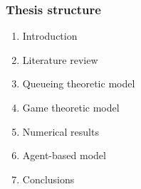 \begin{frame}
    \frametitle{Thesis structure}
    
    \begin{enumerate}
        \item Introduction
        \item Literature review
        \item Queueing theoretic model
        \item Game theoretic model
        \item Numerical results
        \item Agent-based model
        \item Conclusions
    \end{enumerate}

    

\end{frame}